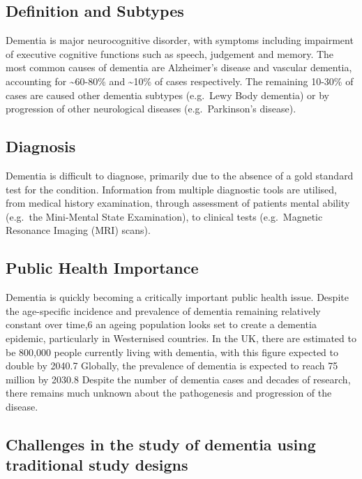 \documentclass[a4paper, nobind]{templates/ociamthesis}
\begin{document}
\hypertarget{definition-and-subtypes}{%
\subsection{Definition and Subtypes}\label{definition-and-subtypes}}

Dementia is major neurocognitive disorder, with symptoms including impairment of executive cognitive functions such as speech, judgement and memory. The most common causes of dementia are Alzheimer's disease and vascular dementia, accounting for \textasciitilde60-80\% and \textasciitilde10\% of cases respectively. The remaining 10-30\% of cases are caused other dementia subtypes (e.g.~Lewy Body dementia) or by progression of other neurological diseases (e.g.~Parkinson's disease).

\hypertarget{diagnosis}{%
\subsection{Diagnosis}\label{diagnosis}}

Dementia is difficult to diagnose, primarily due to the absence of a gold standard test for the condition. Information from multiple diagnostic tools are utilised, from medical history examination, through assessment of patients mental ability (e.g.~the Mini-Mental State Examination), to clinical tests (e.g.~Magnetic Resonance Imaging (MRI) scans).

\hypertarget{public-health-importance}{%
\subsection{Public Health Importance}\label{public-health-importance}}

Dementia is quickly becoming a critically important public health issue. Despite the age-specific incidence and prevalence of dementia remaining relatively constant over time,6 an ageing population looks set to create a dementia epidemic, particularly in Westernised countries. In the UK, there are estimated to be 800,000 people currently living with dementia, with this figure expected to double by 2040.7 Globally, the prevalence of dementia is expected to reach 75 million by 2030.8 Despite the number of dementia cases and decades of research, there remains much unknown about the pathogenesis and progression of the disease.

\hypertarget{challenges-in-the-study-of-dementia-using-traditional-study-designs}{%
\subsection{Challenges in the study of dementia using traditional study designs}\label{challenges-in-the-study-of-dementia-using-traditional-study-designs}}
\end{document}
